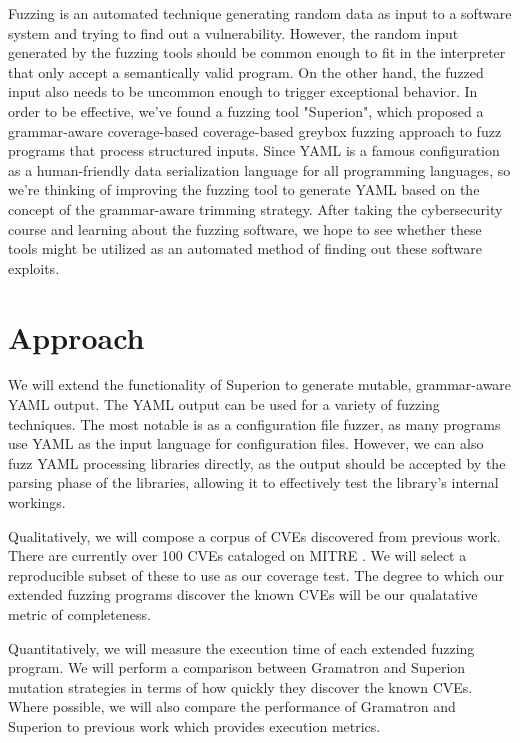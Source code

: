 \documentclass[12pt]{diazessay}
\begin{document}
Fuzzing is an automated technique generating random data as input to a software system and trying to find out a vulnerability.
However, the random input generated by the fuzzing tools should be common enough to fit in the interpreter that only accept a semantically valid program. On the other hand, the fuzzed input also needs to be uncommon enough to trigger exceptional behavior.
In order to be effective, we've found a fuzzing tool "Superion"\cite{superion}, which proposed a grammar-aware coverage-based coverage-based greybox fuzzing approach to fuzz programs that process structured inputs.
Since YAML is a famous configuration as a human-friendly data serialization language for all programming languages, so we're thinking of improving the fuzzing tool to generate YAML based on the concept of the grammar-aware trimming strategy.
After taking the cybersecurity course and learning about the fuzzing software, we hope to see whether these tools might be utilized as an automated method of finding out these software exploits.


\section*{Approach}

We will extend the functionality of Superion to generate mutable, grammar-aware YAML output.
The YAML output can be used for a variety of fuzzing techniques.
The most notable is as a configuration file fuzzer, as many programs use YAML as the input language for configuration files.
However, we can also fuzz YAML processing libraries\cite{libfYAML}\cite{libYAML}\cite{YAMLcpp}\cite{rapidYAML}\cite{miniYAML} directly, as the output should be accepted by the parsing phase of the libraries, allowing it to effectively test the library's internal workings.

Qualitatively, we will compose a corpus of CVEs discovered from previous work.
There are currently over 100 CVEs cataloged on MITRE \cite{MITRE}.
We will select a reproducible subset of these to use as our coverage test.
The degree to which our extended fuzzing programs discover the known CVEs will be our qualatative metric of completeness.

Quantitatively, we will measure the execution time of each extended fuzzing program.
We will perform a comparison between Gramatron and Superion mutation strategies in terms of how quickly they discover the known CVEs.
Where possible, we will also compare the performance of Gramatron and Superion to previous work which provides execution metrics.
\end{document}
